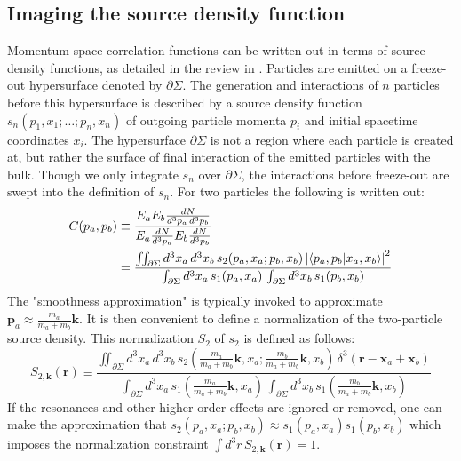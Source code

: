 \subsection{Imaging the source density function}
Momentum space correlation functions can be written out in terms of source density functions, as detailed in the review in .
Particles are emitted on a freeze-out hypersurface denoted by $\partial\Sigma$.
The generation and interactions of $n$ particles before this hypersurface is described by a source density function $s_n(p_1, x_1;\ldots; p_n, x_n)$ of outgoing particle momenta $p_i$ and initial spacetime coordinates $x_i$.
The hypersurface $\partial\Sigma$ is not a region where each particle is created at, but rather the surface of final interaction of the emitted particles with the bulk.
Though we only integrate $s_n$ over $\partial\Sigma$, the interactions before freeze-out are swept into the definition of $s_n$.
For two particles the following is written out:
\begin{equation}
  \begin{split}
  C(p_a,p_b) &\equiv \frac{E_a E_b \frac{dN}{d^3 p_a \, d^3 p_b}}{E_a \frac{dN}{d^3 p_a} E_b \frac{dN}{d^3p_b}} 
  \\&= \frac{\iint_{\partial\Sigma} d^3 x_a \, d^3 x_b \, s_2 (p_a, x_a; p_b, x_b) \left| \braket{ p_a, p_b | x_a, x_b } \right|^2}{\int_{\partial\Sigma} d^3 x_a \, s_1 (p_a, x_a) \, \int_{\partial\Sigma} d^3 x_b \, s_1(p_b, x_b)}
  \end{split}
\end{equation}
The "smoothness approximation" is typically invoked to approximate $\mathbf{p}_a \approx \frac{m_a}{m_a+m_b} \mathbf{k}$.
It is then convenient to define a normalization of the two-particle source density.
This normalization $S_2$ of $s_2$ is defined as follows:
\begin{equation} S_{2, \mathbf{k}} (\mathbf{r}) \equiv \frac{\iint_{\partial\Sigma} d^3 x_a \, d^3 x_b \, s_2 \left(\frac{m_a}{m_a+m_b}\mathbf{k}, x_a; \frac{m_b}{m_a+m_b}\mathbf{k}, x_b\right) \, \delta^3(\mathbf{r} - \mathbf{x}_a + \mathbf{x}_b)}{\int_{\partial\Sigma} d^3 x_a \, s_1 \left(\frac{m_a}{m_a+m_b}\mathbf{k}, x_a\right) \, \int_{\partial\Sigma} d^3 x_b \, s_1\left(\frac{m_b}{m_a+m_b}\mathbf{k}, x_b\right)}\end{equation}
If the resonances and other higher-order effects are ignored or removed, one can make the approximation that $s_2 (p_a, x_a; p_b, x_b) \approx s_1(p_a, x_a) s_1(p_b, x_b)$ which imposes the normalization constraint $\int d^3 r \, S_{2,\mathbf{k}}(\mathbf{r}) = 1$.


